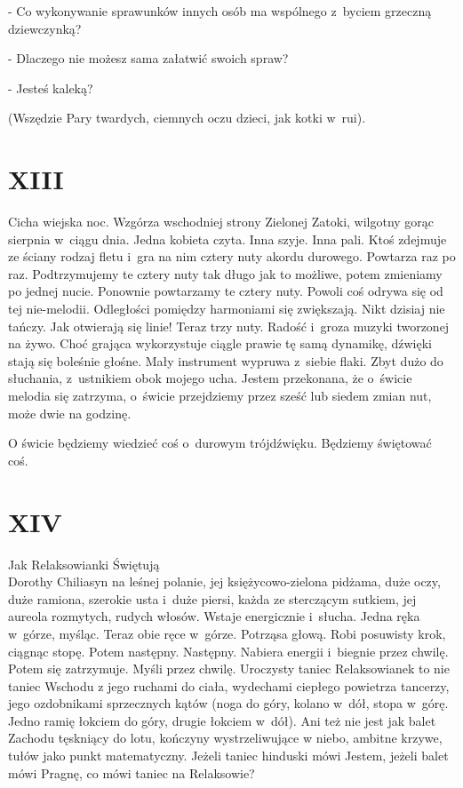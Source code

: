 \documentclass[oneside,polish,12pt,sfheadings]{mwbk}
\begin{document}
- Co wykonywanie
sprawunków innych osób ma wspólnego z~byciem grzeczną dziewczynką?

- Dlaczego nie możesz sama załatwić swoich spraw?

- Jesteś kaleką?

(Wszędzie Pary twardych, ciemnych oczu dzieci, jak kotki w~rui).

\chapter{XIII}

Cicha wiejska noc. Wzgórza wschodniej strony Zielonej Zatoki, wilgotny
gorąc sierpnia w~ciągu dnia. Jedna kobieta czyta. Inna szyje. Inna
pali. Ktoś zdejmuje ze ściany rodzaj fletu i~gra na nim cztery nuty
akordu durowego. Powtarza raz po raz. Podtrzymujemy te cztery nuty
tak długo jak to możliwe, potem zmieniamy po jednej nucie. Ponownie
powtarzamy te cztery nuty. Powoli coś odrywa się od tej nie-melodii.
Odległości pomiędzy harmoniami się zwiększają. Nikt dzisiaj nie tańczy.
Jak otwierają się linie! Teraz trzy nuty. Radość i~groza muzyki tworzonej
na żywo. Choć grająca wykorzystuje ciągle prawie tę samą dynamikę,
dźwięki stają się boleśnie głośne. Mały instrument wypruwa z~siebie
flaki. Zbyt dużo do słuchania, z~ustnikiem obok mojego ucha. Jestem
przekonana, że o~świcie melodia się zatrzyma, o~świcie przejdziemy
przez sześć lub siedem zmian nut, może dwie na godzinę.

O świcie będziemy wiedzieć coś o~durowym trójdźwięku. Będziemy świętować
coś.

\chapter{XIV}

Jak Relaksowianki Świętują\\

Dorothy Chiliasyn na leśnej polanie, jej księżycowo-zielona pidżama,
duże oczy, duże ramiona, szerokie usta i~duże piersi, każda ze sterczącym
sutkiem, jej aureola rozmytych, rudych włosów. Wstaje energicznie
i~słucha. Jedna ręka w~górze, myśląc. Teraz obie ręce w~górze. Potrząsa
głową. Robi posuwisty krok, ciągnąc stopę. Potem następny. Następny.
Nabiera energii i~biegnie przez chwilę. Potem się zatrzymuje. Myśli
przez chwilę. Uroczysty taniec Relaksowianek to nie taniec Wschodu
z jego ruchami do ciała, wydechami ciepłego powietrza tancerzy, jego
ozdobnikami sprzecznych kątów (noga do góry, kolano w~dół, stopa w~górę. Jedno ramię łokciem do góry, drugie łokciem w~dół). Ani też
nie jest jak balet Zachodu tęskniący do lotu, kończyny wystrzeliwujące
w niebo, ambitne krzywe, tułów jako punkt matematyczny. Jeżeli taniec
hinduski mówi Jestem, jeżeli balet mówi Pragnę, co mówi taniec na
Relaksowie?
\end{document}
